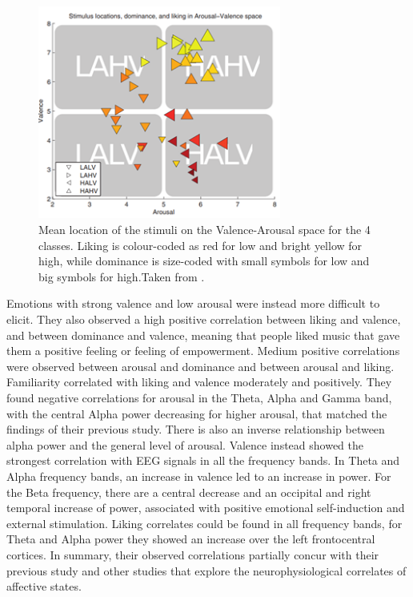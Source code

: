 \begin{figure}[h!]
\includegraphics[width=8cm]{img/related_work/koelstra_va_space.png}
\centering
\caption{ Mean location of the stimuli on the Valence-Arousal space for the 4 classes. Liking is colour-coded as red for low and bright yellow for high, while dominance is size-coded with small symbols for low and big symbols for high.Taken from \cite{koelstra_deap_2012}.}\label{fig_koelstra_va_space}
\end{figure}

Emotions with strong valence and low arousal were instead more difficult to elicit. They also observed a high positive correlation between liking and valence, and between dominance and valence, meaning that people liked music that gave them a positive feeling or feeling of empowerment. Medium positive correlations were observed between arousal and dominance and between arousal and liking. Familiarity correlated with liking and valence moderately and positively.
They found negative correlations for arousal in the Theta, Alpha and Gamma band, with the central Alpha power decreasing for higher arousal, that matched the findings of their previous study. There is also an inverse relationship between alpha power and the general level of arousal. Valence instead showed the strongest correlation with \ac{EEG} signals in all the frequency bands. In Theta and Alpha frequency bands, an increase in valence led to an increase in power. For the Beta frequency, there are a central decrease and an occipital and right temporal increase of power, associated with positive emotional self-induction and external stimulation. Liking correlates could be found in all frequency bands, for Theta and Alpha power they showed an increase over the left frontocentral cortices. In summary, their observed correlations partially concur with their previous study and other studies that explore the neurophysiological correlates of affective states. 


